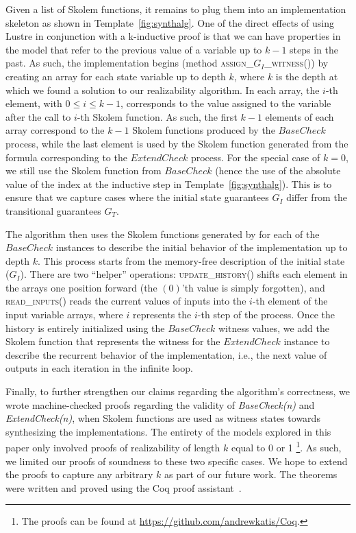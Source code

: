 Given a list of Skolem functions, it remains to plug them into
an implementation skeleton as shown in Template~\ref{fig:synthalg}. One of the
direct effects of using Lustre in conjunction with a k-inductive proof
is that we can have properties in the model that refer to the
previous value of a variable up to $k-1$ steps in the past. As such,
the implementation begins (method \textsc{assign\_$G_{I}$\_witness()})
by creating an array for each state variable up to depth $k$, where
$k$ is the depth at which we found a solution to our realizability
algorithm. In each array, the $i$-th element, with $0\leq i \leq k-1$,
corresponds to the value assigned to the variable after the call to
$i$-th Skolem function. As such, the first $k-1$ elements of each array
correspond to the $k-1$ Skolem functions produced by the
$\mathit{BaseCheck}$ process, while the last element is used by the
Skolem function generated from the formula corresponding to the
$\mathit{ExtendCheck}$ process. For the special case of $k=0$, we still use
the Skolem function from $\mathit{BaseCheck}$ (hence the use of
the absolute value of the index at the inductive step in
Template~\ref{fig:synthalg}).
This is to ensure that we capture cases where the initial state guarantees $G_I$ differ from the
transitional guarantees $G_T$.

The algorithm then uses the Skolem functions generated by \aeval for each
of the $\mathit{BaseCheck}$ instances to describe the initial behavior of
the implementation up to depth $k$.  This process starts from the memory-free
description of the initial state ($G_I$).
There are two ``helper'' operations:
\textsc{update\_history()} shifts each element in the arrays one position
forward (the $(0)$'th value is simply forgotten), and \textsc{read\_inputs()} reads the
current values of inputs into the $i$-th element of the input variable arrays,
where $i$ represents the $i$-th step of the process.
Once the history is entirely initialized using the $\mathit{BaseCheck}$ witness values,
we add the Skolem function that represents the witness for the
$\mathit{ExtendCheck}$ instance to describe the recurrent behavior of the implementation, i.e.,
the next value of outputs in each iteration in the infinite loop.

Finally, to further strengthen our claims regarding the algorithm's
correctness, we wrote machine-checked proofs regarding the validity of \textit{BaseCheck(n)} and
\textit{ExtendCheck(n)}, when Skolem functions are used as witness states
towards synthesizing the implementations. The entirety of the models explored in
this paper only involved proofs of realizability of length $k$ equal to 0 or
1%
\footnote{The proofs can be found at \url{https://github.com/andrewkatis/Coq}.}.
As such, we limited our proofs of soundness to these two specific cases. We hope
to extend the proofs to capture any arbitrary $k$ as part of our future work.
The theorems were written and proved using the Coq proof
assistant~\cite{Coqmanual}.

